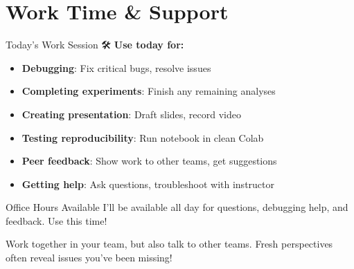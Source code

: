 \documentclass[aspectratio=169]{beamer}
\begin{document}
\section{Work Time \& Support}

\begin{frame}[shrink=10]{Today's Work Session 🛠️}
\textbf{Use today for:}
\begin{itemize}\setlength{\itemsep}{0pt}
    \item \textbf{Debugging}: Fix critical bugs, resolve issues
    \item \textbf{Completing experiments}: Finish any remaining analyses
    \item \textbf{Creating presentation}: Draft slides, record video
    \item \textbf{Testing reproducibility}: Run notebook in clean Colab
    \item \textbf{Peer feedback}: Show work to other teams, get suggestions
    \item \textbf{Getting help}: Ask questions, troubleshoot with instructor
\end{itemize}

\vspace{0.3cm}

\begin{alertblock}{Office Hours Available}
I'll be available all day for questions, debugging help, and feedback. Use this time!
\end{alertblock}

\vspace{0.3cm}

\begin{protip}
Work together in your team, but also talk to other teams. Fresh perspectives often reveal issues you've been missing!
\end{protip}
\end{frame}
\end{document}
